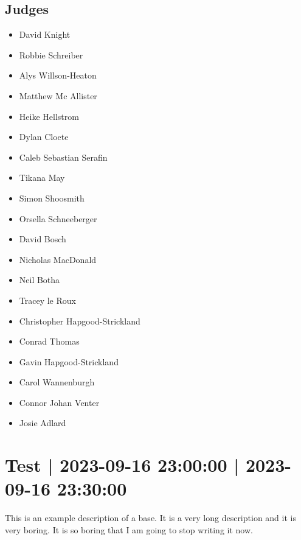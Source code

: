 \documentclass[10pt]{article}
\begin{document}
	\subsection*{Judges}
	\begin{itemize}

			\item David Knight
			\item Robbie Schreiber
			\item Alys Willson-Heaton
			\item Matthew Mc Allister
			\item Heike Hellstrom
			\item Dylan Cloete
			\item Caleb Sebastian Serafin
			\item Tikana May
			\item Simon Shoosmith
			\item Orsella Schneeberger
			\item David Bosch
			\item Nicholas MacDonald
			\item Neil Botha
			\item Tracey le Roux
			\item Christopher Hapgood-Strickland
			\item Conrad Thomas
			\item Gavin Hapgood-Strickland
			\item Carol Wannenburgh
			\item Connor Johan Venter
			\item Josie Adlard
		\end{itemize}

			\setcounter{section}{27}
	\section{Test | 2023-09-16 23:00:00 | 2023-09-16 23:30:00}
	This is an example description of a base. It is a very long description and it is very boring. It is so boring that I am going to stop writing it now.
\end{document}
